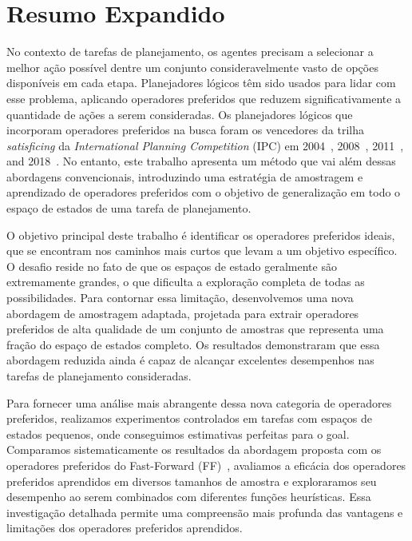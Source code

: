 \documentclass[ppgc,diss,english]{iiufrgs}
\begin{document}


\chapter{Resumo Expandido}
\noindent

No contexto de tarefas de planejamento, os agentes precisam a selecionar a melhor ação possível dentre um conjunto consideravelmente vasto de opções disponíveis em cada etapa. Planejadores lógicos têm sido usados para lidar com esse problema, aplicando operadores preferidos que reduzem significativamente a quantidade de ações a serem consideradas. Os planejadores lógicos que incorporam operadores preferidos na busca foram os vencedores da trilha \emph{satisficing} da \emph{International Planning Competition} (IPC) em 2004~\cite{Helmert/2006}, 2008~\cite{Richter.lama.etal/2010}, 2011~\cite{Richter.lama.etal/2011}, and 2018~\cite{Seipp-fast.etal/2018}.
No entanto, este trabalho apresenta um método que vai além dessas abordagens convencionais, introduzindo uma estratégia de amostragem e aprendizado de operadores preferidos com o objetivo de generalização em todo o espaço de estados de uma tarefa de planejamento.

O objetivo principal deste trabalho é identificar os operadores preferidos ideais, que se encontram nos caminhos mais curtos que levam a um objetivo específico. O desafio reside no fato de que os espaços de estado geralmente são extremamente grandes, o que dificulta a exploração completa de todas as possibilidades. Para contornar essa limitação, desenvolvemos uma nova abordagem de amostragem adaptada, projetada para extrair operadores preferidos de alta qualidade de um conjunto de amostras que representa uma fração do espaço de estados completo. Os resultados demonstraram que essa abordagem reduzida ainda é capaz de alcançar excelentes desempenhos nas tarefas de planejamento consideradas.

Para fornecer uma análise mais abrangente dessa nova categoria de operadores preferidos, realizamos experimentos controlados em tarefas com espaços de estados pequenos, onde conseguimos estimativas perfeitas para o goal. Comparamos sistematicamente os resultados da abordagem proposta com os operadores preferidos do Fast-Forward (FF)~\cite{Hoffmann.Nebel/2001, Helmert/2006}, avaliamos a eficácia dos operadores preferidos aprendidos em diversos tamanhos de amostra e exploraramos seu desempenho ao serem combinados com diferentes funções heurísticas. Essa investigação detalhada permite uma compreensão mais profunda das vantagens e limitações dos operadores preferidos aprendidos.
\end{document}
